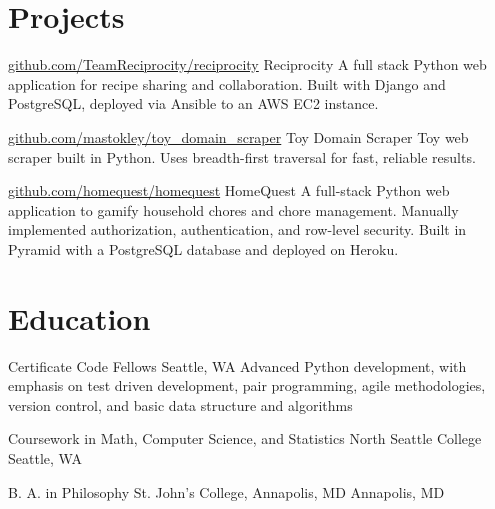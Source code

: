 \documentclass[10pt,a4paper,sans]{moderncv}        %
\begin{document}
\section{Projects}

\begin{comment}

  \cventry
  {date}
  {github url}
  {name}
  {}
  {}
  {description}

\end{comment}

{\href{http://github.com/TeamReciprocity/reciprocity}{github.com/TeamReciprocity/reciprocity}}
{Reciprocity} {} {} {A full stack Python web application for recipe sharing and
  collaboration. Built with Django and PostgreSQL, deployed via Ansible to an
  AWS EC2 instance.}

{\href{https://github.com/mastokley/toy_domain_scraper}{github.com/mastokley/toy\_domain\_scraper}}
{Toy Domain Scraper} {} {} {Toy web scraper built in Python. Uses breadth-first
  traversal for fast, reliable results.}

{\href{https://github.com/homequest/homequest}{github.com/homequest/homequest}}
{HomeQuest} {} {} {A full-stack Python web application to gamify household
  chores and chore management. Manually implemented authorization,
  authentication, and row-level security. Built in Pyramid with a PostgreSQL
  database and deployed on Heroku.}

\section{Education}
 {Certificate} {Code Fellows} {Seattle, WA} {} {Advanced Python
  development, with emphasis on test driven development, pair programming, agile
  methodologies, version control, and basic data structure and algorithms}

 {Coursework in Math, Computer Science, and Statistics}
{North Seattle College} {Seattle, WA} {} {}

 {B. A. in Philosophy} {St. John's College, Annapolis, MD}
{Annapolis, MD} {} {}
\end{document}
